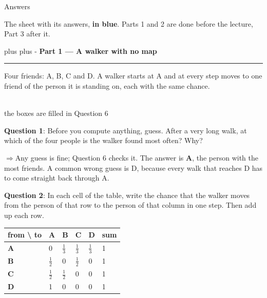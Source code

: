 \documentclass[a4paper, 14pt]{extarticle}
\newcommand{\ppfont}{}
\renewcommand{\ppfont}{}}}}
\newcommand{\needroom}[1]{%
  \par
  \begingroup
    \setlength{\dimen0}{#1}%
    \vskip 0pt plus \dimen0
    \penalty -100%
    \vskip 0pt plus -\dimen0
  \endgroup}
\newcommand{\parthead}[2]{%
  \needroom{6\baselineskip}%
  \partheadhere{#1}{#2}}
\newcommand{\partheadhere}[2]{%
  \vspace{0.5em}
  {\large\bfseries Part #1 --- #2}\par
  \vspace{-0.4em}\rule{\textwidth}{0.8pt}\par
  \vspace{0.1em}}
\newcommand{\ans}[1]{\textbf{\textcolor{pltblue!75!black}{#1}}}
\newcommand{\arrow}{\textcolor{pltblue!75!black}{$\Rightarrow$}\;}
\newcommand{\mans}[1]{{\color{pltblue!75!black}#1}}
\begin{document}
\begin{center}
{\ppfont\LARGE Answers}
\end{center}

{\small The sheet with its answers, \ans{in blue}. Parts 1 and 2 are done
before the lecture, Part 3 after it.}

\parthead{1}{A walker with no map}

Four friends: A, B, C and D. A walker starts at A and at every step moves to
one friend of the person it is standing on, each with the same chance.

\begin{center}
\\[0.2em]
{\small the boxes are filled in Question 6}
\end{center}

{\bf Question 1}: Before you compute anything, guess. After a very long walk,
at which of the four people is the walker found most often? Why?

\arrow Any guess is fine; Question 6 checks it. The answer is \ans{A}, the
person with the most friends. A common wrong guess is D, because every walk
that reaches D has to come straight back through A.

{\bf Question 2}: In each cell of the table, write the chance that the walker
moves from the person of that row to the person of that column in one step.
Then add up each row.

\begin{center}
{\setlength{\tabcolsep}{6pt}
\begin{tabular}{|C{2.4cm}|C{1.5cm}|C{1.5cm}|C{1.5cm}|C{1.5cm}|C{1.5cm}|}
\hline
\small from \textbackslash{} to & \bfseries A & \bfseries B & \bfseries C & \bfseries D & \small sum \\
\hline
\bfseries A & \mans{0} & \mans{$\frac13$} & \mans{$\frac13$} & \mans{$\frac13$} & \mans{1} \\[0.12cm] \hline
\bfseries B & \mans{$\frac12$} & \mans{0} & \mans{$\frac12$} & \mans{0} & \mans{1} \\[0.12cm] \hline
\bfseries C & \mans{$\frac12$} & \mans{$\frac12$} & \mans{0} & \mans{0} & \mans{1} \\[0.12cm] \hline
\bfseries D & \mans{1} & \mans{0} & \mans{0} & \mans{0} & \mans{1} \\[0.12cm] \hline
\end{tabular}}
\end{center}
\end{document}
